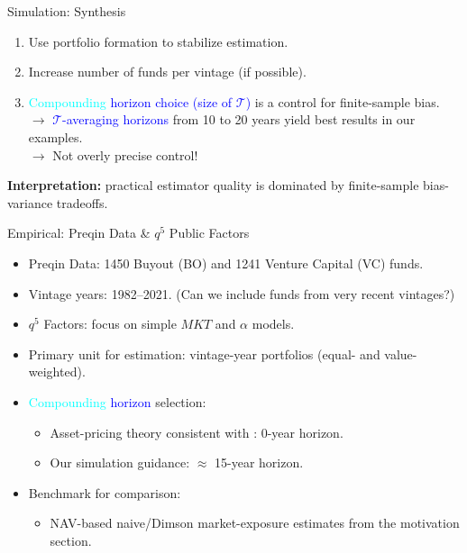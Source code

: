 \documentclass[aspectratio=169,11pt]{beamer}
\begin{document}
\begin{frame}{Simulation: Synthesis}
\begin{enumerate}
  \item Use portfolio formation to stabilize estimation.
  \item Increase number of funds per vintage (if possible).
  \item \textcolor{cyan}{Compounding} \textcolor{blue}{horizon choice (size of $\mathcal{T}$)} is a control for finite-sample bias. \\
  $\to$ \textcolor{blue}{$\mathcal{T}$-averaging horizons} from 10 to 20 years yield best results in our examples. \\
  $\to$ Not overly precise control!
\end{enumerate}

\vspace{0.4em}
\textbf{Interpretation:} practical estimator quality is dominated by finite-sample bias-variance tradeoffs.
\end{frame}

\begin{frame}{Empirical: Preqin Data \& $q^5$ Public Factors}
\begin{itemize}
  \item Preqin Data: 1450 Buyout (BO) and 1241 Venture Capital (VC) funds.
  \item Vintage years: 1982--2021. (Can we include funds from very recent vintages?)
  \item $q^5$ Factors: focus on simple $MKT$ and $\alpha$ models.
   \item Primary unit for estimation: vintage-year portfolios (equal- and value-weighted).
  \item \textcolor{cyan}{Compounding} \textcolor{blue}{horizon} selection:
   \begin{itemize}
    \item Asset-pricing theory consistent with \cite{DLP12}: 0-year horizon.
  	\item Our simulation guidance: $\approx$ 15-year horizon.
  \end{itemize}
  \item Benchmark for comparison: 
  \begin{itemize}
	\item NAV-based naive/Dimson market-exposure estimates from the motivation section.
  \end{itemize}
\end{itemize}

\end{frame}
\end{document}
